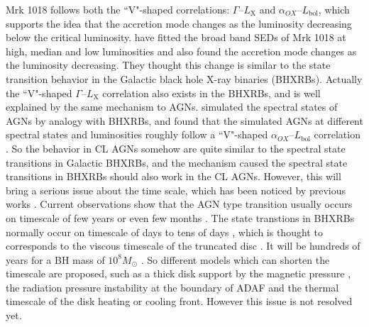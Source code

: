 \documentclass[twocolumn]{aastex63}
\newcommand{\alphaox}{$\alpha_{OX}$}
\begin{document}
Mrk 1018 follows both the ``V"-shaped correlations: $\Gamma$--$L_\mathrm{X}$ and \alphaox--$L_\mathrm{bol}$, which supports the idea that the accretion mode changes as the luminosity decreasing below the critical luminosity. \citet{Noda2018} have fitted the broad band SEDs of Mrk 1018 at high, median and low luminosities and also found the accretion mode changes as the luminosity decreasing. They thought this change is similar to the state transition behavior in the Galactic black hole X-ray binaries (BHXRBs). Actually the ``V"-shaped $\Gamma$--$L_\mathrm{X}$ correlation also exists in the BHXRBs, and is well explained by the same mechanism to AGNs. \citet{Sobolewska2011} simulated the spectral states of AGNs by analogy with BHXRBs, and found that the simulated AGNs at different spectral states and luminosities roughly follow a ``V"-shaped \alphaox--$L_\mathrm{bol}$ correlation \citep[see also in ][]{2019ApJ...883...76R}. So the behavior in CL AGNs somehow are quite similar to the spectral state transitions in Galactic BHXRBs, and the mechanism caused the spectral state transitions in BHXRBs should also work in the CL AGNs. However, this will bring a serious issue about the time scale, which has been noticed by previous works \citep[e.g. ][]{Lawrence2018,Stern2018,Noda2018,Liu2020}. Current observations show that the AGN type transition usually occurs on timescale of few years\citep{McElroy2016,Stern2018, Parker2019,Liu2020} or even few months \citep{Trakhtenbrot2019}. The state transtions in BHXRBs normally occur on timescale of days to tens of days \citep{Yu2009,Dunn2010}, which is thought to corresponds to the viscous timescale of the truncated disc \citep[see reviews in ][]{Done2007}. It will be hundreds of years for a BH mass of $10^{8} M_{\odot}$ \citep[see detailed discussions in ][]{Stern2018,Liu2020}. So different models which can shorten the timescale are proposed, such as a thick disk support by the magnetic pressure \citep{2019MNRAS.483L..17D}, the radiation pressure instability at the boundary of ADAF \citep{Sniegowska2019} and the thermal timescale of the disk heating or cooling front\citep{Stern2018}. However this issue is not resolved yet. 
\end{document}
